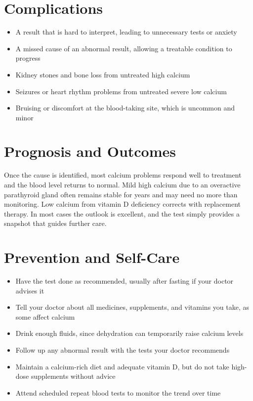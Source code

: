 \section*{Complications}
\begin{itemize}
    \item A result that is hard to interpret, leading to unnecessary tests or anxiety
    \item A missed cause of an abnormal result, allowing a treatable condition to progress
    \item Kidney stones and bone loss from untreated high calcium
    \item Seizures or heart rhythm problems from untreated severe low calcium
    \item Bruising or discomfort at the blood-taking site, which is uncommon and minor
\end{itemize}

\section*{Prognosis and Outcomes}
Once the cause is identified, most calcium problems respond well to treatment and the blood level returns to normal. Mild high calcium due to an overactive parathyroid gland often remains stable for years and may need no more than monitoring. Low calcium from vitamin D deficiency corrects with replacement therapy. In most cases the outlook is excellent, and the test simply provides a snapshot that guides further care.

\section*{Prevention and Self-Care}
\begin{itemize}
    \item Have the test done as recommended, usually after fasting if your doctor advises it
    \item Tell your doctor about all medicines, supplements, and vitamins you take, as some affect calcium
    \item Drink enough fluids, since dehydration can temporarily raise calcium levels
    \item Follow up any abnormal result with the tests your doctor recommends
    \item Maintain a calcium-rich diet and adequate vitamin D, but do not take high-dose supplements without advice
    \item Attend scheduled repeat blood tests to monitor the trend over time
\end{itemize}

